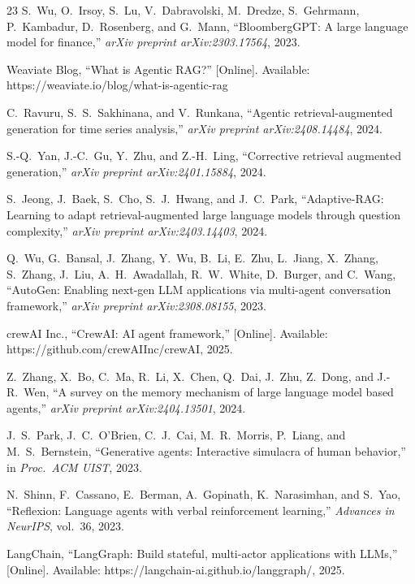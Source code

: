 \documentclass[conference]{IEEEtran}
\begin{document}
\begin{thebibliography}{23}
S.~Wu, O.~Irsoy, S.~Lu, V.~Dabravolski, M.~Dredze, S.~Gehrmann, P.~Kambadur, D.~Rosenberg, and G.~Mann, ``BloombergGPT: A large language model for finance,'' \textit{arXiv preprint arXiv:2303.17564}, 2023.

Weaviate Blog, ``What is Agentic RAG?'' [Online]. Available: https://weaviate.io/blog/what-is-agentic-rag

C.~Ravuru, S.~S.~Sakhinana, and V.~Runkana, ``Agentic retrieval-augmented generation for time series analysis,'' \textit{arXiv preprint arXiv:2408.14484}, 2024.

S.-Q.~Yan, J.-C.~Gu, Y.~Zhu, and Z.-H.~Ling, ``Corrective retrieval augmented generation,'' \textit{arXiv preprint arXiv:2401.15884}, 2024.

S.~Jeong, J.~Baek, S.~Cho, S.~J.~Hwang, and J.~C.~Park, ``Adaptive-RAG: Learning to adapt retrieval-augmented large language models through question complexity,'' \textit{arXiv preprint arXiv:2403.14403}, 2024.

Q.~Wu, G.~Bansal, J.~Zhang, Y.~Wu, B.~Li, E.~Zhu, L.~Jiang, X.~Zhang, S.~Zhang, J.~Liu, A.~H.~Awadallah, R.~W.~White, D.~Burger, and C.~Wang, ``AutoGen: Enabling next-gen LLM applications via multi-agent conversation framework,'' \textit{arXiv preprint arXiv:2308.08155}, 2023.

crewAI Inc., ``CrewAI: AI agent framework,'' [Online]. Available: https://github.com/crewAIInc/crewAI, 2025.

Z.~Zhang, X.~Bo, C.~Ma, R.~Li, X.~Chen, Q.~Dai, J.~Zhu, Z.~Dong, and J.-R.~Wen, ``A survey on the memory mechanism of large language model based agents,'' \textit{arXiv preprint arXiv:2404.13501}, 2024.

J.~S.~Park, J.~C.~O'Brien, C.~J.~Cai, M.~R.~Morris, P.~Liang, and M.~S.~Bernstein, ``Generative agents: Interactive simulacra of human behavior,'' in \textit{Proc.\ ACM UIST}, 2023.

N.~Shinn, F.~Cassano, E.~Berman, A.~Gopinath, K.~Narasimhan, and S.~Yao, ``Reflexion: Language agents with verbal reinforcement learning,'' \textit{Advances in NeurIPS}, vol.~36, 2023.

LangChain, ``LangGraph: Build stateful, multi-actor applications with LLMs,'' [Online]. Available: https://langchain-ai.github.io/langgraph/, 2025.


\end{thebibliography}
\end{document}
